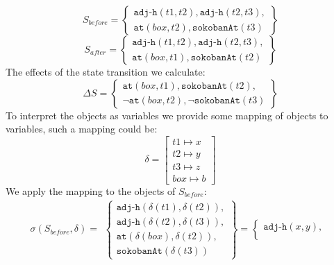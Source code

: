 \documentclass[../Master.tex]{subfiles}
\begin{document}
\begin{example}
\begin{equation*}\label{eq:s_before}
S_{before} =
	\left\{
		\begin{gathered}
			\texttt{adj-h}(t1, t2), \texttt{adj-h}(t2, t3), \\
			\texttt{at}(box,t2), \texttt{sokobanAt}(t3)
		\end{gathered}
	\right\}
\end{equation*}
\begin{equation*}
S_{after} =
	\left\{
		\begin{gathered}
			\texttt{adj-h}(t1, t2), \texttt{adj-h}(t2, t3), \\
			\texttt{at}(box,t1), \texttt{sokobanAt}(t2)
		\end{gathered}
	\right\}
\end{equation*}
The effects of the state transition we calculate:
\begin{equation*}
\Delta S =
	\left\{
		\begin{gathered}
			\texttt{at}(box, t1), \texttt{sokobanAt}(t2), \\
			\neg\texttt{at}(box,t2), \neg\texttt{sokobanAt}(t3)
		\end{gathered}
	\right\}
\end{equation*}
To interpret the objects as variables we provide some mapping of objects to variables, such a mapping could be:
\begin{equation*}
\delta =
	\left [
		\begin{gathered}
			t1 \mapsto x \\
			t2 \mapsto y \\
			t3 \mapsto z \\
			box \mapsto b
		\end{gathered}
	\right ]
\end{equation*}
We apply the mapping to the objects of $S_{before}$:
\begin{equation*}
	\sigma(S_{before}, \delta) =
	\begin{gathered}
		\left\{
			\begin{gathered}
				\texttt{adj-h}(\delta (t1), \delta (t2)), \\
				\texttt{adj-h}(\delta (t2), \delta (t3)), \\
				\texttt{at}(\delta (box),\delta (t2)), \\
				 \texttt{sokobanAt}(\delta (t3))
			\end{gathered}
		\right\}
		=
		\left\{
			\begin{gathered}
				\texttt{adj-h}(x, y), \\

\end{gathered}
\end{gathered}
\end{equation*}
\end{example}
\end{document}
